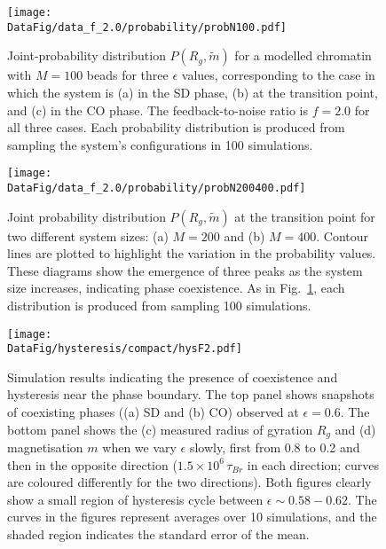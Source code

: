 \documentclass[12pt]{article}
\newcommand*{\DataFig}{/Users/MichaelChiang/Desktop/epigenetics_data/}
\begin{document}
\begin{figure}[h]
\vspace{1.5cm}
\centering
\centerline{\texttt{[image: \\DataFig/data\_f\_2.0/probability/probN100.pdf]}}
\caption{Joint-probability distribution $P(R_g,\widetilde{m})$ for a modelled chromatin with $M = 100$ beads for three $\epsilon$ values, corresponding to the case in which the system is (a) in the SD phase, (b) at the transition point, and (c) in the CO phase. The feedback-to-noise ratio is $f = 2.0$ for all three cases. Each probability distribution is produced from sampling the system's configurations in 100 simulations.}
\label{fig:probN100}
\end{figure}
\pagebreak
\begin{figure}
\centering
\texttt{[image: \\DataFig/data\_f\_2.0/probability/probN200400.pdf]}
\caption{Joint probability distribution $P(R_g,\widetilde{m})$ at the transition point for two different system sizes: (a) $M = 200$ and (b) $M = 400$. Contour lines are plotted to highlight the variation in the probability values. These diagrams show the emergence of three peaks as the system size increases, indicating phase coexistence. As in Fig.~\ref{fig:probN100}, each distribution is produced from sampling 100 simulations.}
\label{fig:probN200400}
\end{figure}
\pagebreak
\begin{figure}[h]
\vspace{1cm}
\centering
\centerline{\texttt{[image: \\DataFig/hysteresis/compact/hysF2.pdf]}}
\caption{Simulation results indicating the presence of coexistence and hysteresis near the phase boundary. The top panel shows snapshots of coexisting phases ((a) SD and (b) CO) observed at $\epsilon = 0.6$. The bottom panel shows the (c) measured radius of gyration $R_g$ and (d) magnetisation $m$ when we vary $\epsilon$ slowly, first from 0.8 to 0.2 and then in the opposite direction ($1.5 \times 10^6\,\tau_{Br}$ in each direction; curves are coloured differently for the two directions). Both figures clearly show a small region of hysteresis cycle between $\epsilon \sim 0.58 - 0.62$. The curves in the figures represent averages over 10 simulations, and the shaded region indicates the standard error of the mean.}
\label{fig:hysF2}
\end{figure}
\pagebreak
\end{document}
